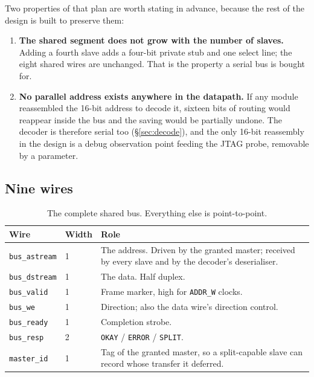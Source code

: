 \documentclass[11pt,a4paper]{article}
\newcommand{\sig}[1]{\texttt{#1}}
\begin{document}
Two properties of that plan are worth stating in advance, because the rest of
the design is built to preserve them:

\begin{enumerate}[leftmargin=1.6em,itemsep=2pt]
\item \textbf{The shared segment does not grow with the number of slaves.}
      Adding a fourth slave adds a four-bit private stub and one select line;
      the eight shared wires are unchanged. That is the property a serial bus
      is bought for.
\item \textbf{No parallel address exists anywhere in the datapath.} If any
      module reassembled the 16-bit address to decode it, sixteen bits of
      routing would reappear inside the bus and the saving would be
      partially undone. The decoder is therefore serial too
      (\S\ref{sec:decode}), and the only 16-bit reassembly in the design is
      a debug observation point feeding the JTAG probe, removable by a
      parameter.
\end{enumerate}

\subsection{Nine wires}

\begin{table}[htb]
\centering\small
\caption{The complete shared bus. Everything else is point-to-point.}
\label{tab:wires}
\begin{tabularx}{\textwidth}{@{}llX@{}}
\toprule
\textbf{Wire} & \textbf{Width} & \textbf{Role}\\
\midrule
\sig{bus\_astream} & 1 & The address. Driven by the granted master; received
                         by every slave and by the decoder's deserialiser.\\
\sig{bus\_dstream} & 1 & The data. Half duplex.\\
\sig{bus\_valid}   & 1 & Frame marker, high for \sig{ADDR\_W} clocks.\\
\sig{bus\_we}      & 1 & Direction; also the data wire's direction control.\\
\sig{bus\_ready}   & 1 & Completion strobe.\\
\sig{bus\_resp}    & 2 & \sig{OKAY} / \sig{ERROR} / \sig{SPLIT}.\\
\sig{master\_id}   & 1 & Tag of the granted master, so a split-capable slave
                         can record whose transfer it deferred.\\
\bottomrule
\end{tabularx}
\end{table}
\end{document}
